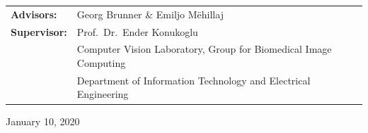 \begin{titlepage}
\begin{center}
    \end{center}


    \vfill
    \begin{center}
        \begin{tabular}{ll}
            \Large{\textbf{Advisors:}}   & \Large{Georg Brunner \& Emiljo Mëhillaj}                                 \\
            \Large{\textbf{Supervisor:}} & \Large{Prof.~Dr.~Ender Konukoglu}                                        \\
                                         & \small{Computer Vision Laboratory, Group for Biomedical Image Computing} \\
                                         & \small{Department of Information Technology and Electrical Engineering}  \\
        \end{tabular}
    \end{center}

    \begin{center}
        January 10, 2020
    \end{center}


\end{titlepage}

